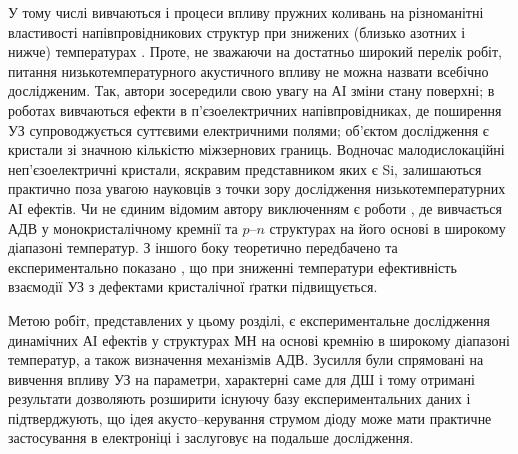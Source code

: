 \documentclass[a4paper,14pt,oneside,openany]{memoir}
\begin{document}
У тому числі вивчаються і процеси впливу пружних коливань на різноманітні властивості напівпровідникових структур при знижених
(близько азотних і нижче) температурах
\cite{Savkina:FM2003,Savkina:SPQEO2013,Savkina:PJTF2015,Savkina:PSSc2015,Savkina2015,Savkina:JPD2010,kryshtab_savkina_smirnov_2013,
Vlasenko2000r,SavkinaPSSB2002,Zhuravlev,BorkovFTT,sheinkman1995,belyaev1994,buyanova1994,Ostapenko1994,KorotchenAPL1998,KOROTCHENKOV1998,
Korotchenkov1995,KorotchFTP1996,YOlikh:UFG2016,YOlikh:SupMicr,YOlikhTPL2011r}.
Проте, не зважаючи на достатньо широкий перелік робіт, питання низькотемпературного акустичного впливу не можна назвати всебічно дослідженим.
Так, автори \cite{Savkina:FM2003,Savkina:SPQEO2013,Savkina:PJTF2015,Savkina:PSSc2015,Savkina2015,Savkina:JPD2010,kryshtab_savkina_smirnov_2013}
зосередили свою увагу на АІ зміни стану поверхні;
в роботах \cite{Zhuravlev,BorkovFTT,sheinkman1995,belyaev1994,buyanova1994,Ostapenko1994,KorotchenAPL1998,KOROTCHENKOV1998} вивчаються ефекти в п'єзоелектричних
напівпровідниках, де поширення УЗ супроводжується суттєвими електричними полями;
об'єктом дослідження \cite{Vlasenko2000r,SavkinaPSSB2002,YOlikh:UFG2016,YOlikh:SupMicr} є кристали зі значною кількістю міжзернових границь.
Водночас малодислокаційні неп'єзоелектричні кристали, яскравим представником яких є Si, залишаються практично поза увагою
науковців з точки зору дослідження низькотемпературних АІ ефектів.
Чи не єдиним відомим автору виключенням є роботи \cite{Korotchenkov1995,KorotchFTP1996,YOlikhTPL2011r},
де вивчається АДВ у монокристалічному кремнії та $p$--$n$ структурах на його основі в широкому діапазоні температур.
З іншого боку теоретично передбачено \cite{Pavlovich} та експериментально показано \cite{YOlikh:UFG2016,YOlikh:SupMicr},
що при зниженні температури ефективність взаємодії УЗ з дефектами кристалічної ґратки підвищується.

Метою робіт, представлених у цьому розділі, є
експериментальне дослідження динамічних АІ ефектів у структурах МН на основі кремнію в широкому діапазоні температур,
а також визначення механізмів АДВ.
Зусилля були спрямовані на вивчення впливу УЗ на параметри, характерні саме для ДШ і тому отримані результати дозволяють розширити
існуючу базу експериментальних даних і підтверджують, що
ідея акусто--керування струмом діоду може мати практичне застосування в електроніці і заслуговує на подальше дослідження.

%
%
\end{document}
